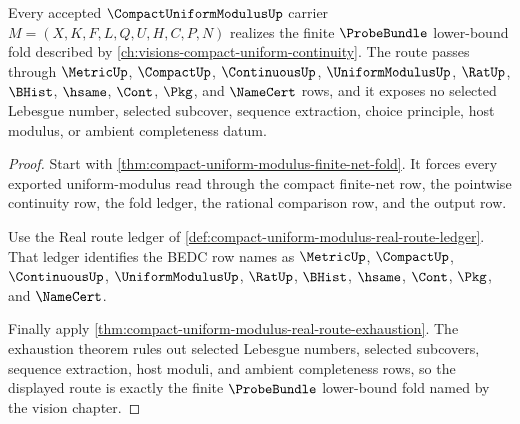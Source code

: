\begin{theorem}
\label{thm:compact-uniform-modulus-vision-route}
Every accepted $\CompactUniformModulusUp$ carrier $M=(X,K,F,L,Q,U,H,C,P,N)$ realizes the finite $\ProbeBundle$ lower-bound fold described by \autoref{ch:visions-compact-uniform-continuity}. The route passes through $\MetricUp$, $\CompactUp$, $\ContinuousUp$, $\UniformModulusUp$, $\RatUp$, $\BHist$, $\hsame$, $\Cont$, $\Pkg$, and $\NameCert$ rows, and it exposes no selected Lebesgue number, selected subcover, sequence extraction, choice principle, host modulus, or ambient completeness datum.
\end{theorem}
\begin{proof}
Start with \autoref{thm:compact-uniform-modulus-finite-net-fold}. It forces every exported uniform-modulus read through the compact finite-net row, the pointwise continuity row, the fold ledger, the rational comparison row, and the output row.

Use the Real route ledger of \autoref{def:compact-uniform-modulus-real-route-ledger}. That ledger identifies the BEDC row names as $\MetricUp$, $\CompactUp$, $\ContinuousUp$, $\UniformModulusUp$, $\RatUp$, $\BHist$, $\hsame$, $\Cont$, $\Pkg$, and $\NameCert$.

Finally apply \autoref{thm:compact-uniform-modulus-real-route-exhaustion}. The exhaustion theorem rules out selected Lebesgue numbers, selected subcovers, sequence extraction, host moduli, and ambient completeness rows, so the displayed route is exactly the finite $\ProbeBundle$ lower-bound fold named by the vision chapter.
\end{proof}

